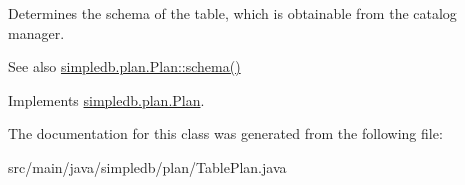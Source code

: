 Determines the schema of the table, which is obtainable from the catalog manager. \begin{DoxySeeAlso}{See also}
\hyperlink{interfacesimpledb_1_1plan_1_1Plan_ad0ee1aa2c4e7147e9f8fc6f3301fa986}{simpledb.\+plan.\+Plan\+::schema()} 
\end{DoxySeeAlso}


Implements \hyperlink{interfacesimpledb_1_1plan_1_1Plan_ad0ee1aa2c4e7147e9f8fc6f3301fa986}{simpledb.\+plan.\+Plan}.



The documentation for this class was generated from the following file\+:\begin{DoxyCompactItemize}
\item 
src/main/java/simpledb/plan/Table\+Plan.\+java\end{DoxyCompactItemize}
